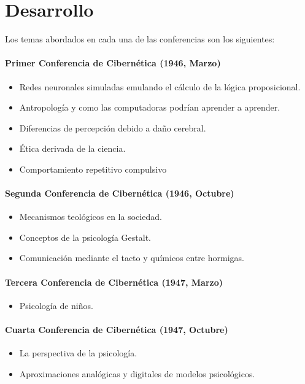 \section{Desarrollo}
	Los temas abordados en cada una de las conferencias son los siguientes:
	\paragraph{Primer Conferencia de Cibernética (1946, Marzo)}
	\begin{itemize}
		\item Redes neuronales simuladas emulando el cálculo de la lógica proposicional.
		\item Antropología y como las computadoras podrían aprender a aprender.
		\item Diferencias de percepción debido a daño cerebral.
		\item Ética derivada de la ciencia.
		\item Comportamiento repetitivo compulsivo
	\end{itemize}
	\paragraph{Segunda Conferencia de Cibernética (1946, Octubre)}
	\begin{itemize}
		\item Mecanismos teológicos en la sociedad.
		\item Conceptos de la psicología Gestalt.
		\item Comunicación mediante el tacto y químicos entre hormigas.
	\end{itemize}
	\paragraph{Tercera Conferencia de Cibernética (1947, Marzo)}
	\begin{itemize}
		\item Psicología de niños.
	\end{itemize}
	\paragraph{Cuarta Conferencia de Cibernética (1947, Octubre)}
	\begin{itemize}
		\item La perspectiva de la psicología.
		\item Aproximaciones analógicas y digitales de modelos psicológicos.
	\end{itemize}
